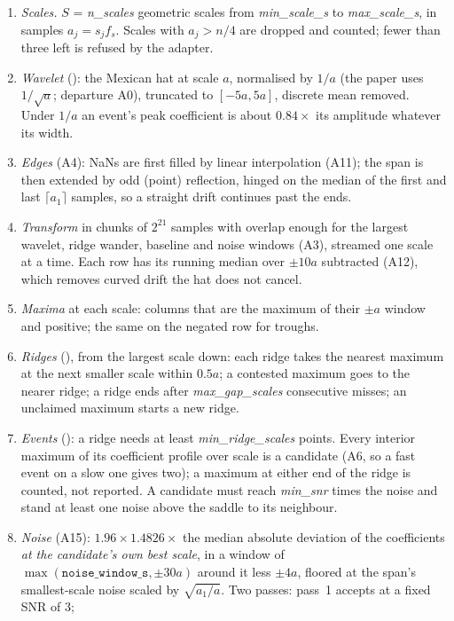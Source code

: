 \begin{enumerate}
\item \emph{Scales.} $S$ = \emph{n\_scales} geometric scales from \emph{min\_scale\_s} to
  \emph{max\_scale\_s}, in samples $a_j = s_j f_s$. Scales with $a_j > n/4$ are dropped and
  counted; fewer than three left is refused by the adapter.
\item \emph{Wavelet} (): the Mexican hat at scale $a$, normalised by $1/a$ (the
  paper uses $1/\sqrt a$; departure A0), truncated to $[-5a, 5a]$, discrete mean removed.
  Under $1/a$ an event's peak coefficient is about $0.84\times$ its amplitude whatever its width.
\item \emph{Edges} (A4): NaNs are first filled by linear interpolation (A11); the span is then
  extended by odd (point) reflection, hinged on the median of the first and last
  $\lceil a_1\rceil$ samples, so a straight drift continues past the ends.
\item \emph{Transform} in chunks of $2^{21}$ samples with overlap enough for the largest wavelet,
  ridge wander, baseline and noise windows (A3), streamed one scale at a time. Each row has its
  running median over $\pm 10a$ subtracted (A12), which removes curved drift the hat does not
  cancel.
\item \emph{Maxima} at each scale: columns that are the maximum of their $\pm a$ window and
  positive; the same on the negated row for troughs.
\item \emph{Ridges} (), from the largest scale down: each ridge takes the
  nearest maximum at the next smaller scale within $0.5a$; a contested maximum goes to the
  nearer ridge; a ridge ends after \emph{max\_gap\_scales} consecutive misses; an unclaimed
  maximum starts a new ridge.
\item \emph{Events} (): a ridge needs at least \emph{min\_ridge\_scales}
  points. Every interior maximum of its coefficient profile over scale is a candidate (A6, so a
  fast event on a slow one gives two); a maximum at either end of the ridge is counted, not
  reported. A candidate must reach \emph{min\_snr} times the noise and stand at least one noise
  above the saddle to its neighbour.
\item \emph{Noise} (A15): $1.96\times1.4826\times$ the median absolute deviation of the
  coefficients \emph{at the candidate's own best scale}, in a window of
  $\max(\texttt{noise\_window\_s}, \pm30a)$ around it less $\pm4a$, floored at the span's
  smallest-scale noise scaled by $\sqrt{a_1/a}$. Two passes: pass~1 accepts at a fixed SNR of 3;

\end{enumerate}
